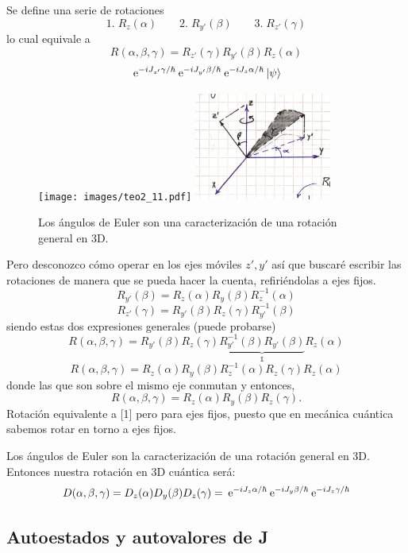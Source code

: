 \documentclass[10pt,oneside]{CBFT_book}
\begin{document}
Se define una serie de rotaciones 
\[
	1.\; R_{z}(\alpha) \qquad 2.\; R_{y'}(\beta)\qquad 3.\; R_{z'}(\gamma)
\]
lo cual equivale a
\[
	R(\alpha,\beta,\gamma) = R_{z'}(\gamma) R_{y'}(\beta) R_{z}(\alpha)
\]
\[
	\:\mathrm{e}^{-i J_{z'}\gamma/\hbar} \:\mathrm{e}^{-i J_{y'}\beta/\hbar}  \:\mathrm{e}^{-i J_z\alpha/\hbar} 
	\Ket{\psi}
\]
\begin{figure}[!htb]
	\begin{center}
	\texttt{[image: images/teo2\_11.pdf]}
	\includegraphics[width=0.4\textwidth]{images/fig_ft2_convencion_euler_angles.jpg}
	\end{center}
	\caption{Los ángulos de Euler son una caracterización de una rotación general en 3D.}
\end{figure} 
Pero desconozco cómo operar en los ejes móviles $z',y'$ así que buscaré escribir las rotaciones 
de manera que se pueda hacer la cuenta, refiriéndolas a ejes fijos.
\[
	R_{y'}(\beta) = R_{z}(\alpha) R_{y}(\beta) R_{z}^{-1}(\alpha) 
\]
\[
	R_{z'}(\gamma) = R_{y'}(\beta) R_{z}(\gamma) R_{y'}^{-1}(\beta) 
\]
siendo estas dos expresiones generales (puede probarse)
\[
	R(\alpha,\beta,\gamma) =
	R_{y'}(\beta) R_{z}(\gamma) \underbrace{R_{y'}^{-1}(\beta)R_{y'}(\beta)}_{\mathbb{1}}R_{z}(\alpha) 
\]
\[
	R(\alpha,\beta,\gamma) =
	R_{z}(\alpha) R_{y}(\beta) R_{z}^{-1}(\alpha) R_{z}(\gamma) R_{z}(\alpha)  
\]
donde las que son sobre el mismo eje conmutan y entonces,
\[
	R(\alpha,\beta,\gamma) = R_{z}(\alpha) R_{y}(\beta) R_{z}(\gamma).
\]
Rotación equivalente a [1] pero para ejes fijos, puesto que en mecánica cuántica sabemos rotar en torno a 
ejes fijos.

Los ángulos de Euler son la caracterización de una rotación general en 3D.
Entonces nuestra rotación en 3D cuántica será:
\[
	D(\alpha,\beta,\gamma) = D_z(\alpha) D_y(\beta) D_z(\gamma)  =
	\:\mathrm{e}^{-i J_z\alpha/\hbar} \:\mathrm{e}^{-i J_y\beta/\hbar} \:\mathrm{e}^{-i J_z\gamma/\hbar}
\]

\subsection{Autoestados y autovalores de J}
\end{document}

